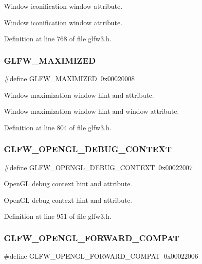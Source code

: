 Window iconification window attribute. 

Window iconification window attribute. 

Definition at line 768 of file glfw3.\+h.

\mbox{\label{group__window_gad8ccb396253ad0b72c6d4c917eb38a03}} 
\subsubsection{\texorpdfstring{GLFW\_MAXIMIZED}{GLFW\_MAXIMIZED}}
{\footnotesize\ttfamily \#define G\+L\+F\+W\+\_\+\+M\+A\+X\+I\+M\+I\+Z\+ED~0x00020008}



Window maximization window hint and attribute. 

Window maximization window hint and window attribute. 

Definition at line 804 of file glfw3.\+h.

\mbox{\label{group__window_ga87ec2df0b915201e950ca42d5d0831e1}} 
\subsubsection{\texorpdfstring{GLFW\_OPENGL\_DEBUG\_CONTEXT}{GLFW\_OPENGL\_DEBUG\_CONTEXT}}
{\footnotesize\ttfamily \#define G\+L\+F\+W\+\_\+\+O\+P\+E\+N\+G\+L\+\_\+\+D\+E\+B\+U\+G\+\_\+\+C\+O\+N\+T\+E\+XT~0x00022007}



Open\+GL debug context hint and attribute. 

Open\+GL debug context hint and attribute. 

Definition at line 951 of file glfw3.\+h.

\mbox{\label{group__window_ga13d24b12465da8b28985f46c8557925b}} 
\subsubsection{\texorpdfstring{GLFW\_OPENGL\_FORWARD\_COMPAT}{GLFW\_OPENGL\_FORWARD\_COMPAT}}
{\footnotesize\ttfamily \#define G\+L\+F\+W\+\_\+\+O\+P\+E\+N\+G\+L\+\_\+\+F\+O\+R\+W\+A\+R\+D\+\_\+\+C\+O\+M\+P\+AT~0x00022006}



